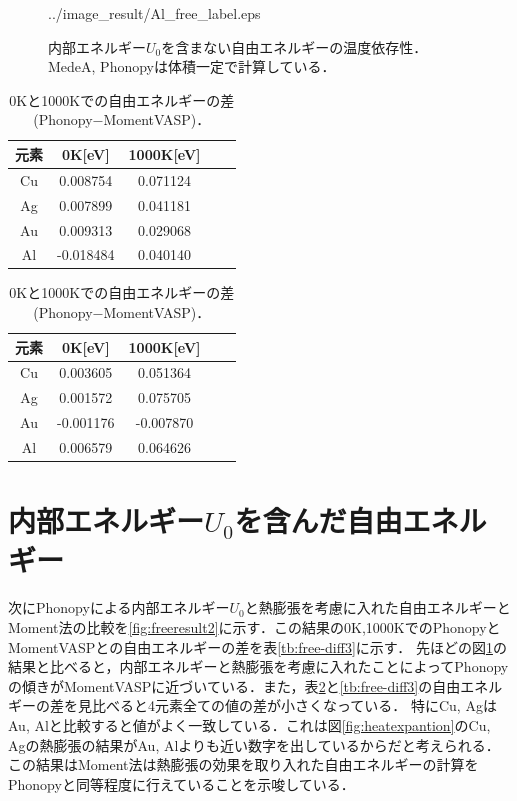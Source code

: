 \begin{figure}[htbp]
\begin{minipage}[b]{0.5\linewidth}
  {../image_result/Al_free_label.eps}
  \label{free4}
 \end{minipage}
 \caption{内部エネルギー$U_0$を含まない自由エネルギーの温度依存性．MedeA, Phonopyは体積一定で計算している．}\label{fig:freeresult}
\end{figure}



\begin{table}[htbp]
  \begin{minipage}[b]{0.48\linewidth}
  \centering
  \caption{0Kと1000Kでの自由エネルギーの差(MedeA$-$MomentVASP)．}
  \label{tb:free-diff}
  \begin{tabular}{ccccc}\hline
    元素 & 0K[eV] & 1000K[eV] \\ \hline \hline
    Cu & 0.008754 & 0.071124 \\
    Ag & 0.007899 & 0.041181\\
    Au & 0.009313 & 0.029068\\
    Al & -0.018484 & 0.040140\\ \hline
  \end{tabular}
 \end{minipage}
 \hspace{0.04\linewidth}
 \begin{minipage}[b]{0.48\linewidth}
 \caption{0Kと1000Kでの自由エネルギーの差(Phonopy$-$MomentVASP)．}
 \label{tb:free-diff2}
  \centering
  \begin{tabular}{ccccc}\hline
    元素 & 0K[eV] & 1000K[eV] \\ \hline \hline
    Cu & 0.003605 & 0.051364  \\
    Ag & 0.001572 & 0.075705 \\
    Au & -0.001176 & -0.007870 \\
    Al & 0.006579 & 0.064626 \\ \hline
  \end{tabular}
 \end{minipage}
\end{table}




\section{内部エネルギー$U_0$を含んだ自由エネルギー}
次にPhonopyによる内部エネルギー$U_0$と熱膨張を考慮に入れた自由エネルギーとMoment法の比較を\ref{fig:freeresult2}に示す．この結果の0K,1000KでのPhonopyとMomentVASPとの自由エネルギーの差を表\ref{tb:free-diff3}に示す．
先ほどの図\ref{fig:freeresult}の結果と比べると，内部エネルギーと熱膨張を考慮に入れたことによってPhonopyの傾きがMomentVASPに近づいている．また，表\ref{tb:free-diff2}と\ref{tb:free-diff3}の自由エネルギーの差を見比べると4元素全ての値の差が小さくなっている．
特にCu, AgはAu, Alと比較すると値がよく一致している．これは図\ref{fig:heatexpantion}のCu, Agの熱膨張の結果がAu, Alよりも近い数字を出しているからだと考えられる．
この結果はMoment法は熱膨張の効果を取り入れた自由エネルギーの計算をPhonopyと同等程度に行えていることを示唆している．

